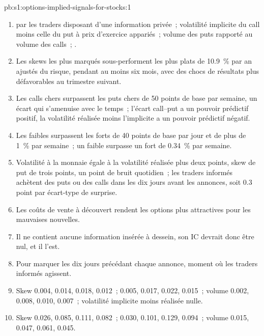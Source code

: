 \begin{solution}{pb:s1:options-implied-signals-for-stocks:1}
\begin{enumerate}
\item {} par les traders disposant d'une information privée~; volatilité implicite du call moins celle du put à prix d'exercice appariés~; volume des puts rapporté au volume des calls~; .
\item Les skews les plus marqués sous-performent les plus plats de 10.9~\% par an ajustés du risque, pendant au moins six mois, avec des chocs de résultats plus défavorables au trimestre suivant.
\item Les calls chers surpassent les puts chers de 50 points de base par semaine, un écart qui s'amenuise avec le temps~; l'écart call--put a un pouvoir prédictif positif, la volatilité réalisée moins l'implicite
a un pouvoir prédictif négatif.
\item Les faibles  surpassent les forts de 40 points de base par jour et de plus de 1~\% par semaine~; un faible  surpasse un fort de 0.34~\% par semaine.
\item Volatilité à la monnaie égale à la volatilité réalisée plus deux points, skew de put de trois points, un point de bruit quotidien~; les traders informés achètent des puts ou des calls dans les
dix jours avant les annonces, soit 0.3 point par écart-type de surprise.
\item Les coûts de vente à découvert rendent les options plus attractives pour les mauvaises nouvelles.
\item Il ne contient aucune information insérée à dessein, son IC devrait donc être nul, et il l'est.
\item Pour marquer les dix jours précédant chaque annonce, moment où les traders informés agissent.
\item Skew 0.004, 0.014, 0.018, 0.012~;  0.005, 0.017, 0.022, 0.015~; volume 0.002, 0.008, 0.010, 0.007~; volatilité implicite moins réalisée nulle.
\item Skew 0.026, 0.085, 0.111, 0.082~;  0.030, 0.101, 0.129, 0.094~; volume 0.015, 0.047, 0.061, 0.045.

\end{enumerate}
\end{solution}
